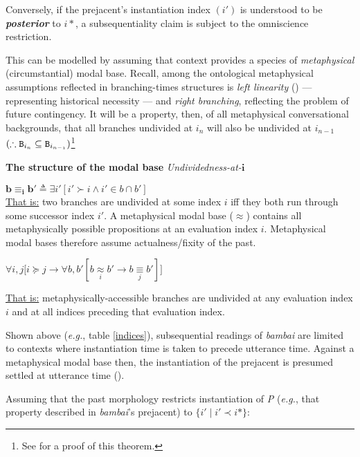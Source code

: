 Conversely, if the prejacent's instantiation index $( i' )$ is understood to be \textbf{\textit{posterior }}to $ i* $, a subsequentiality claim is subject to the omniscience restriction.

This can be modelled by assuming that context provides a species of \textit{metaphysical} (circumstantial) modal base. Recall, among the ontological metaphysical assumptions reflected in branching-times structures is \textit{left linearity} () --- representing historical necessity --- and \textit{right branching}, reflecting the problem of future contingency. It will be a property, then, of all metaphysical conversational backgrounds, that all branches undivided at $ i_n $ will also be undivided at $ i_{n-1} $ ${(\therefore\mathtt{B_\mathnormal{i_n}\subseteq B_{\mathnormal{i_{n-1}}}})}$\footnote{See \citet[79-80]{Rumberg2016a} for a proof of this theorem.}

\pex \textbf{The structure of the modal base}
\a \textit{Undividedness-at-$ \boldsymbol i $} 

$\boldsymbol{ b \equiv_i b' }\triangleq \exists i'[i'\succ i\wedge i'\in b\cap b']$\\
\ul{That is:} two branches are undivided at some index $ i $ iff they both run through some successor index $ i' $.
\a A metaphysical modal base ($ \boldsymbol{\approx} $) contains all metaphysically possible propositions at an evaluation index $ i $.
\a Metaphysical modal bases therefore assume actualness/fixity of the past. 

$ \forall i,j\big[i\succcurlyeq j\to\forall b,b'[b\underset{i}{\approx} b'\to b\underset{j}{\equiv} b']\big] $

\ul{That is:} metaphysically-accessible branches are undivided at any evaluation index $ i $ and at all indices preceding that evaluation index.
\xe

Shown above (\textit{e.g.}, table \ref{indices}), subsequential readings of \textit{bambai} are limited to contexts where instantiation time is taken to precede utterance time. Against a metaphysical modal base then, the instantiation of the prejacent is presumed settled at utterance time (\nextx).

\pex Assuming that the past morphology restricts instantiation of \textit{P} (\textit{e.g.}, that property described in \textit{bambai}'s prejacent) to $ \{i'\mid i'\prec i*\} $:

